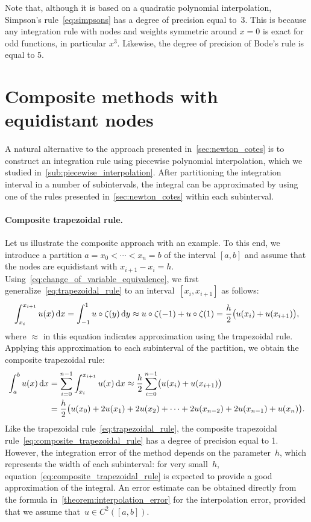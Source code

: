 \begin{remark}
    Note that,
    although it is based on a quadratic polynomial interpolation,
    Simpson's rule~\eqref{eq:simpsons} has a degree of precision equal to~$3$.
    This is because any integration rule with nodes and weights symmetric around $x=0$ is exact for odd functions,
    in particular $x^3$.
    Likewise, the degree of precision of Bode's rule is equal to 5.
\end{remark}

\section{Composite methods with equidistant nodes}
\label{sec:composite_methods}
A natural alternative to the approach presented in~\cref{sec:newton_cotes}
is to construct an integration rule using piecewise polynomial interpolation,
which we studied in~\cref{sub:piecewise_interpolation}.
After partitioning the integration interval in a number of subintervals,
the integral can be approximated by using one of the rules presented in~\eqref{sec:newton_cotes} within each subinterval.

\paragraph{Composite trapezoidal rule.}
Let us illustrate the composite approach with an example.
To this end,
we introduce a partition $a = x_0 < \dotsb < x_n = b$ of the interval $[a, b]$ and
assume that the nodes are equidistant with $x_{i+1} - x_i = h$.
Using~\eqref{eq:change_of_variable_equivalence},
we first generalize~\eqref{eq:trapezoidal_rule} to an interval~$[x_i, x_{i+1}]$ as follows:
\[
    \int_{x_i}^{x_{i+1}} u(x) \, \mathrm d x
    = \int_{-1}^{1} u \circ \zeta (y) \, \mathrm d y
    \approx u \circ \zeta(-1)  + u \circ \zeta(1)
    = \frac{h}{2} \bigl(u(x_i) + u(x_{i+1})\bigr),
\]
where $\approx$ in this equation indicates approximation using the trapezoidal rule.
Applying this approximation to each subinterval of the partition,
we obtain the composite trapezoidal rule:
\begin{align}
    \notag
    \int_{a}^{b} u(x) \, \mathrm d x
    &= \sum_{i=0}^{n-1} \int_{x_i}^{x_{i+1}} u(x) \, \mathrm d x
    \approx
    \frac{h}{2}\sum_{i=0}^{n-1} \bigl( u(x_i) + u(x_{i+1}) \bigr) \\
    \label{eq:composite_trapezoidal_rule}
    &= \frac{h}{2} \bigl( u(x_0) + 2 u(x_1) + 2 u(x_2) + \dotsb + 2 u(x_{n-2}) + 2 u(x_{n-1}) + u(x_n) \bigr).
\end{align}
Like the trapezoidal rule~\eqref{eq:trapezoidal_rule},
the composite trapezoidal rule~\eqref{eq:composite_trapezoidal_rule} has a degree of precision equal to 1.
However,
the integration error of the method depends on the parameter~$h$,
which represents the width of each subinterval:
for very small~$h$,
equation~\eqref{eq:composite_trapezoidal_rule} is expected to provide a good approximation of the integral.
An error estimate can be obtained directly from the formula in~\cref{theorem:interpolation_error} for the interpolation error,
provided that we assume that~$u \in C^2([a, b])$.

